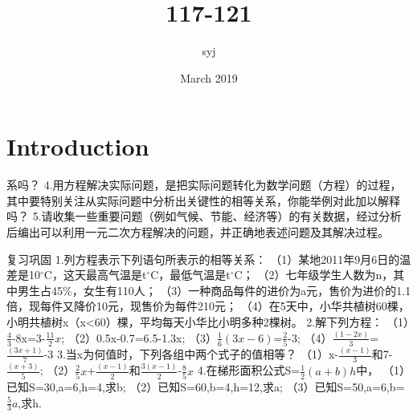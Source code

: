 \documentclass{article}
\title{117-121}
\author{syj}
\date{March 2019}
\begin{document}
\maketitle

\section{Introduction}
\begin{exercise}
系吗？\newline
4.用方程解决实际问题，是把实际问题转化为数学问题（方程）的过程，其中要特别关注从实际问题中分析出关键性的相等关系，你能举例对此加以解释吗？\newline
5.请收集一些重要问题（例如气候、节能、经济等）的有关数据，经过分析后编出可以利用一元二次方程解决的问题，并正确地表述问题及其解决过程。\newline
\end{exercise}

\begin{exercise}
复习巩固\newline
1.列方程表示下列语句所表示的相等关系：\newline
（1）某地2011年9月6日的温差是10$^{\circ}$C，这天最高气温是t$^{\circ}$C，最低气温是t$^{\circ}$C；\newline
（2）七年级学生人数为n，其中男生占45$\%$，女生有110人；\newline
（3）一种商品每件的进价为a元，售价为进价的1.1倍，现每件又降价10元，现售价为每件210元；\newline
（4）在5天中，小华共植树60棵，小明共植树x（x<60）棵，平均每天小华比小明多种2棵树。\newline
2.解下列方程：\newline
（1）$\frac{4}{3}$-8x=3-$\frac{11}{2}x$;\newline
（2）0.5x-0.7=6.5-1.3x;\newline
（3）$\frac{1}{6}(3x-6)$=$\frac{2}{5}$-3;\newline
（4）$\frac{(1-2x)}{3}$=$\frac{(3x+1)}{7}$-3\newline
3.当x为何值时，下列各组中两个式子的值相等？\newline
（1）x-$\frac{(x-1)}{3}$和7-$\frac{(x+3)}{5}$;\newline
（2）$\frac{2}{5}x$+$\frac{(x-1)}{2}$和$\frac{3(x-1)}{2}$-$\frac{8}{5}x$\newline
4.在梯形面积公式S=$\frac{1}{2}(a+b)h$中，\newline
（1）已知S=30,a=6,h=4,求b;\newline
（2）已知S=60,b=4,h=12,求a;\newline
（3）已知S=50,a=6,b=$\frac{5}{3}a$,求h.\newline
\end{exercise}
\end{document}

